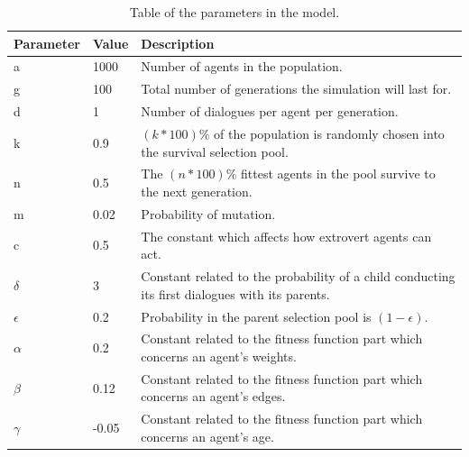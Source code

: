 \begin{table}[htbp]
    \centering
    \caption[The parameters in the model.]{Table of the parameters in the model.}\label{tab:params}
    \begin{tabu} to 1.0\textwidth { X[1,c] X[1,c] X[5,p] }%
         \hline
         \rowfont\bfseries
         Parameter & Value & Description \\ 
         \hline
         a & 1000 & Number of agents in the population. \\ 
         g & 100 & Total number of generations the simulation will last for. \\

         d & 1 & Number of dialogues per agent per generation. \\

         k & 0.9 & $(k \ast 100 )\%$ of the population is randomly chosen into the survival selection pool. \\

         n & 0.5 & The $(n \ast 100 )\%$ fittest agents in the pool survive to the next generation. \\ 

         m & 0.02 & Probability of mutation. \\

         c & 0.5 & The constant which affects how extrovert agents can act. \\
         $\delta$ & 3 & Constant related to the probability of a child conducting its first dialogues with its parents.\\
         
          $\epsilon$ & 0.2 & Probability in the parent selection pool is $(1-\epsilon)$.\\ 

          $\alpha$ & 0.2 & Constant related to the fitness function part which concerns an agent's weights.\\

          $\beta$ & 0.12 & Constant related to the fitness function part which concerns an agent's edges. \\

         $\gamma$ & -0.05 & Constant related to the fitness function part which concerns an agent's age. \\ 
         \hline
    \end{tabu}
\end{table}

